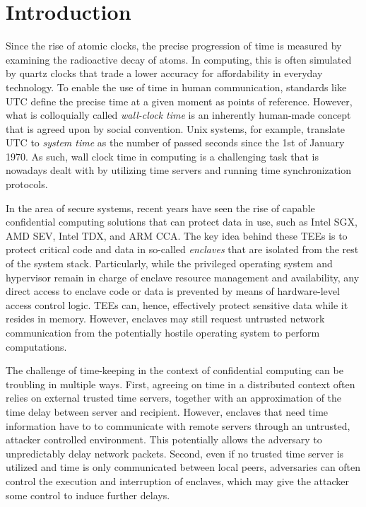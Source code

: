 \section{Introduction}

Since the rise of atomic clocks, the precise progression of time is measured by
examining the radioactive decay of atoms. In computing, this is often simulated
by quartz clocks that trade a lower accuracy for affordability in everyday
technology. To enable the use of time in human communication, standards like
\ac{UTC} define the precise time at a given moment as points of reference.
However, what is colloquially called \emph{wall-clock time} is an inherently
human-made concept that is agreed upon by social convention. Unix systems, for
example, translate \ac{UTC} to \emph{system time} as the number of passed
seconds since the 1st of January 1970. As such, wall clock time in computing is
a challenging task that is nowadays dealt with by utilizing time servers and
running time synchronization protocols.

In the area of secure systems, recent years have seen the rise of capable
confidential computing solutions that can protect data in use, such as Intel
SGX, AMD SEV, Intel TDX, and ARM CCA. The key idea behind these \acp{TEE} is to
protect critical code and data in so-called \emph{enclaves} that are isolated
from the rest of the system stack. Particularly, while the privileged operating
system and hypervisor remain in charge of enclave resource management and
availability, any direct access to enclave code or data is prevented by means of
hardware-level access control logic. \acp{TEE} can, hence, effectively protect
sensitive data while it resides in memory. However, enclaves may still request
untrusted network communication from the potentially hostile operating system to
perform computations.

The challenge of time-keeping in the context of confidential computing can be
troubling in multiple ways. First, agreeing on time in a distributed context
often relies on external trusted time servers, together with an approximation of
the time delay between server and recipient. However, enclaves that need time
information have to to communicate with remote servers through an untrusted,
attacker controlled environment. This potentially allows the adversary to
unpredictably delay network packets. Second, even if no trusted time server is
utilized and time is only communicated between local peers, adversaries can
often control the execution and interruption of enclaves, which may give the
attacker some control to induce further delays.

